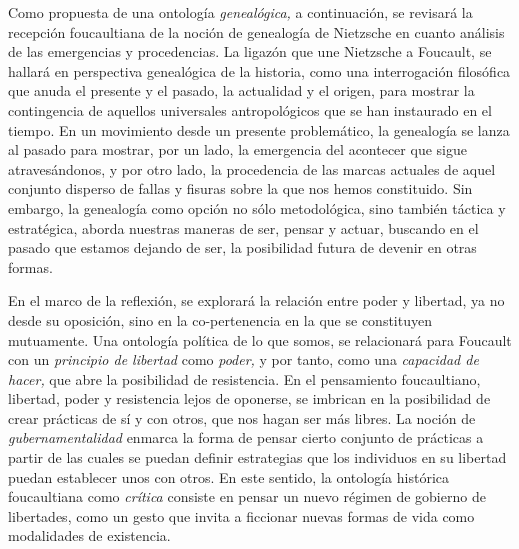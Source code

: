 Como propuesta de una ontología \emph{genealógica,} a continuación, se revisará la recepción foucaultiana de la noción de genealogía de Nietzsche en cuanto análisis de las emergencias y procedencias. La ligazón que une Nietzsche a Foucault, se hallará en perspectiva genealógica de la historia, como una interrogación filosófica que anuda el presente y el pasado, la actualidad y el origen, para mostrar la contingencia de aquellos universales antropológicos que se han instaurado en el tiempo. En un movimiento desde un presente problemático, la genealogía se lanza al pasado para mostrar, por un lado, la emergencia del acontecer que sigue atravesándonos, y por otro lado, la procedencia de las marcas actuales de aquel conjunto disperso de fallas y fisuras sobre la que nos hemos constituido. Sin embargo, la genealogía como opción no sólo metodológica, sino también táctica y estratégica, aborda nuestras maneras de ser, pensar y actuar, buscando en el pasado que estamos dejando de ser, la posibilidad futura de devenir en otras formas.

En el marco de la reflexión, se explorará la relación entre poder y libertad, ya no desde su oposición, sino en la co-pertenencia en la que se constituyen mutuamente. Una ontología política de lo que somos, se relacionará para Foucault con un \emph{principio de libertad} como \emph{poder, }y por tanto, como una \emph{capacidad de hacer,} que abre la posibilidad de resistencia. En el pensamiento foucaultiano, libertad, poder y resistencia lejos de oponerse, se imbrican en la posibilidad de crear prácticas de sí y con otros, que nos hagan ser más libres. La noción de \emph{gubernamentalidad} enmarca la forma de pensar cierto conjunto de prácticas a partir de las cuales se puedan definir estrategias que los individuos en su libertad puedan establecer unos con otros. En este sentido, la ontología histórica foucaultiana como \emph{crítica} consiste en pensar un nuevo régimen de gobierno de libertades, como un gesto que invita a ficcionar nuevas formas de vida como modalidades de existencia.

